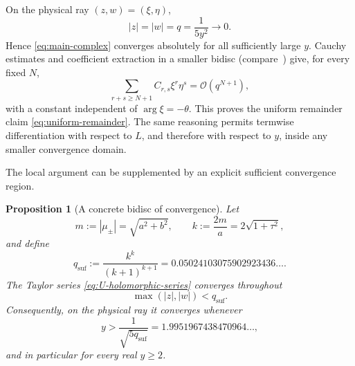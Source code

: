 \documentclass[11pt,oneside]{article}
\numberwithin{equation}{section}
\newtheorem{proposition}[theorem]{Proposition}
\newcommand{\bigO}{\mathcal{O}}
\begin{document}
On the physical ray \((z,w)=(\xi,\eta)\),
\begin{equation}
  |z|=|w|=q=\frac1{5y^2}\longrightarrow0.
\end{equation}
Hence \cref{eq:main-complex} converges absolutely for all sufficiently large
\(y\).  Cauchy estimates and coefficient extraction in a smaller bidisc
(compare~\cite{FlajoletSedgewick2009}) give, for every fixed \(N\),
\begin{equation}
 \sum_{r+s\ge N+1}C_{r,s}\xi^r\eta^s=\bigO(q^{N+1}),
 \label{eq:tail-Cauchy}
\end{equation}
with a constant independent of \(\arg\xi=-\theta\).  This proves the uniform
remainder claim \cref{eq:uniform-remainder}.  The same reasoning permits
termwise differentiation with respect to \(L\), and therefore with respect to
\(y\), inside any smaller convergence domain.

The local argument can be supplemented by an explicit sufficient convergence
region.

\begin{proposition}[A concrete bidisc of convergence]
\label{prop:explicit-convergence}
Let
\begin{equation}
  m:=|\mu_\pm|=\sqrt{a^2+b^2},
  \qquad
  k:=\frac{2m}{a}=2\sqrt{1+\tau^2},
\end{equation}
and define
\begin{equation}
  q_{\mathrm{suf}}
  :=\frac{k^k}{(k+1)^{k+1}}
  =0.05024103075902923436\ldots.
  \label{eq:q-sufficient}
\end{equation}
The Taylor series \cref{eq:U-holomorphic-series} converges throughout
\begin{equation}
  \max(|z|,|w|)<q_{\mathrm{suf}}.
  \label{eq:explicit-bidisc}
\end{equation}
Consequently, on the physical ray it converges whenever
\begin{equation}
  y>\frac1{\sqrt{5q_{\mathrm{suf}}}}
   =1.9951967438470964\ldots,
  \label{eq:y-sufficient}
\end{equation}
and in particular for every real \(y\ge2\).
\end{proposition}
\end{document}
